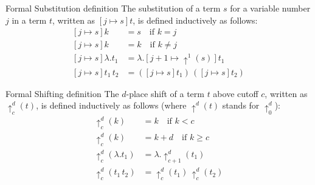 \documentclass[8pt]{beamer}
\begin{document}
\begin{frame}
    \begin{block}{Formal Substitution definition}
        The substitution of a term $s$ for a variable number $j$ in a term $t$,
        written as $[j \mapsto s]t$, is defined inductively as follows:
        \begin{displaymath}
            \begin{split}
                [j \mapsto s]k &= s \quad \text{if } k = j\\
                [j \mapsto s]k &= k \quad \text{if } k \not= j\\
                [j \mapsto s]\lambda.t_{1} &= 
                    \lambda.[j+1 \mapsto \uparrow^{1}(s)]t_{1} \\
                [j \mapsto s]t_1 \, t_2 &= ([j \mapsto s] t_1)\, ([j \mapsto s] t_2)
            \end{split}
        \end{displaymath}
    \end{block}
    \pause 
    \begin{block}{Formal Shifting definition}
        The $d$-place shift of a term $t$ above cutoff $c$,
        written as $\uparrow_{c}^{d}(t)$, is defined inductively as follows
        (where $\uparrow^{d}(t)$ stands for $\uparrow_{0}^{d}$):
        \begin{displaymath}
            \begin{split}
                \uparrow_{c}^{d}(k) &= k \quad \text{if } k < c\\
                \uparrow_{c}^{d}(k) &= k+d \quad \text{if } k \geq c\\
                \uparrow_{c}^{d}(\lambda.t_{1}) &= 
                    \lambda.\uparrow_{c+1}^{d}(t_{1}) \\
                \uparrow_{c}^{d}(t_1 \, t_2) &= \uparrow_{c}^{d}(t_1)\, 
                    \uparrow_{c}^{d}(t_2)
            \end{split}
        \end{displaymath}
    \end{block}
\end{frame}
\end{document}
